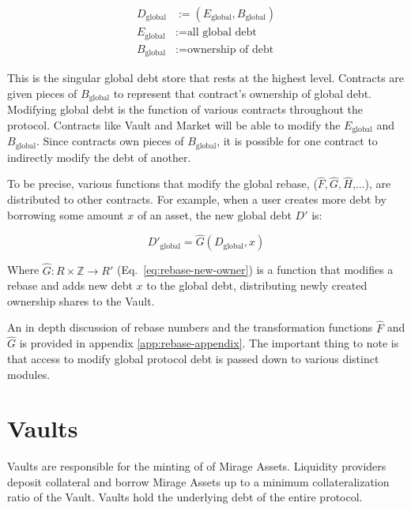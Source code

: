 \documentclass[letterpaper]{article}
\begin{document}
\begin{multicols}{2}
\begin{align}
    D_{\text{global}} &:= (E_{\text{global}}, B_{\text{global}}) \\
    E_{\text{global}} &:= \text{all global debt} \\
    B_{\text{global}} &:= \text{ownership of debt}
\end{align}

This is the singular global debt store that rests at the highest level. Contracts are given pieces of $B_{\text{global}}$ to represent that contract's ownership of global debt. Modifying global debt is the function of various contracts throughout the protocol. Contracts like Vault and Market will be able to modify the $E_{\text{global}}$ and $B_{\text{global}}$. Since contracts own pieces of $B_{\text{global}}$, it is possible for one contract to indirectly modify the debt of another.

To be precise, various functions that modify the global rebase, ($\hat{F}, \hat{G}, \hat{H}$,...), are distributed to other contracts. For example, when a user creates more debt by borrowing some amount $x$ of an asset, the new global debt $D'$ is:

\begin{equation}
    \label{eq:add-debt}
    D'_{\text{global}} = \hat{G}(D_{\text{global}}, x)
\end{equation}

Where $\hat{G}: R \times \mathbb{Z} \rightarrow R'$ (Eq.~\ref{eq:rebase-new-owner}) is a function that modifies a rebase and adds new debt $x$ to the global debt, distributing newly created ownership shares to the Vault.

An in depth discussion of rebase numbers and the transformation functions $\hat{F}$ and $\hat{G}$ is provided in appendix \ref{app:rebase-appendix}. The important thing to note is that access to modify global protocol debt is passed down to various distinct modules.






\section{Vaults}
\label{sec:vaults}

Vaults are responsible for the minting of of Mirage Assets. Liquidity providers deposit collateral and borrow Mirage Assets up to a minimum collateralization ratio of the Vault. Vaults hold the underlying debt of the entire protocol.


\end{multicols}
\end{document}
